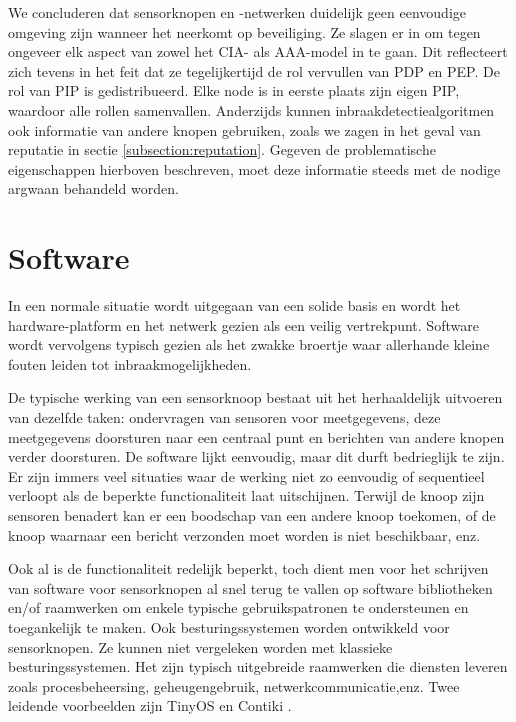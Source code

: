 We concluderen dat sensorknopen en -netwerken duidelijk geen eenvoudige
omgeving zijn wanneer het neerkomt op beveiliging. Ze slagen er in om tegen
ongeveer elk aspect van zowel het CIA- als AAA-model in te gaan. Dit
reflecteert zich tevens in het feit dat ze tegelijkertijd de rol vervullen van
PDP en PEP. De rol van PIP is gedistribueerd. Elke node is in eerste plaats
zijn eigen PIP, waardoor alle rollen samenvallen. Anderzijds kunnen
inbraakdetectiealgoritmen ook informatie van andere knopen gebruiken, zoals we
zagen in het geval van reputatie in sectie \ref{subsection:reputation}. Gegeven
de problematische eigenschappen hierboven beschreven, moet deze informatie
steeds met de nodige argwaan behandeld worden.

\section{Software}
\label{section:problem-software}

In een normale situatie wordt uitgegaan van een solide basis en wordt het
hardware-platform en het netwerk gezien als een veilig vertrekpunt. Software
wordt vervolgens typisch gezien als het zwakke broertje waar allerhande kleine
fouten leiden tot inbraakmogelijkheden.

De typische werking van een sensorknoop bestaat uit het herhaaldelijk uitvoeren
van dezelfde taken: ondervragen van sensoren voor meetgegevens, deze
meetgegevens doorsturen naar een centraal punt en berichten van andere knopen
verder doorsturen. De software lijkt eenvoudig, maar dit durft bedrieglijk te
zijn. Er zijn immers veel situaties waar de werking niet zo eenvoudig of
sequentieel verloopt als de beperkte functionaliteit laat uitschijnen. Terwijl
de knoop zijn sensoren benadert kan er een boodschap van een andere knoop
toekomen, of de knoop waarnaar een bericht verzonden moet worden is niet
beschikbaar, enz.

Ook al is de functionaliteit redelijk beperkt, toch dient men voor het
schrijven van software voor sensorknopen al snel terug te vallen op software
bibliotheken en/of raamwerken om enkele typische gebruikspatronen te
ondersteunen en toegankelijk te maken. Ook besturingssystemen worden ontwikkeld
voor sensorknopen. Ze kunnen niet vergeleken worden met klassieke
besturingssystemen. Het zijn typisch uitgebreide raamwerken die diensten
leveren zoals procesbeheersing, geheugengebruik, netwerkcommunicatie,enz. Twee
leidende voorbeelden zijn TinyOS \citep{levis2005tinyos} en Contiki
\citep{dunkels2004contiki}.

